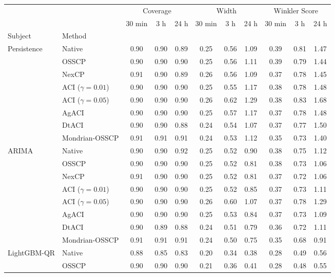 \begin{tabular}{@{}llccccccccc@{}}
\toprule
 &  & \multicolumn{3}{c}{Coverage} & \multicolumn{3}{c}{Width} & \multicolumn{3}{c}{Winkler Score} \\
 &  & 30 min & 3 h & 24 h & 30 min & 3 h & 24 h & 30 min & 3 h & 24 h \\
Subject & Method &  &  &  &  &  &  &  &  &  \\
\midrule
\multirow[t]{8}{*}{Persistence} & Native & 0.90 & 0.90 & 0.89 & 0.25 & 0.56 & 1.09 & 0.39 & 0.81 & 1.47 \\
 & OSSCP & 0.90 & 0.90 & 0.90 & 0.25 & 0.56 & 1.11 & 0.39 & 0.79 & 1.44 \\
 & NexCP & 0.91 & 0.90 & 0.89 & 0.26 & 0.56 & 1.09 & 0.37 & 0.78 & 1.45 \\
 & ACI ($\gamma=0.01$) & 0.90 & 0.90 & 0.90 & 0.25 & 0.55 & 1.17 & 0.38 & 0.78 & 1.48 \\
 & ACI ($\gamma=0.05$) & 0.90 & 0.90 & 0.90 & 0.26 & 0.62 & 1.29 & 0.38 & 0.83 & 1.68 \\
 & AgACI & 0.90 & 0.90 & 0.90 & 0.25 & 0.57 & 1.17 & 0.37 & 0.78 & 1.48 \\
 & DtACI & 0.90 & 0.90 & 0.88 & 0.24 & 0.54 & 1.07 & 0.37 & 0.77 & 1.50 \\
 & Mondrian-OSSCP & 0.91 & 0.91 & 0.91 & 0.24 & 0.53 & 1.12 & 0.35 & 0.73 & 1.40 \\
\cmidrule{1-11}
\multirow[t]{8}{*}{ARIMA} & Native & 0.90 & 0.90 & 0.92 & 0.25 & 0.52 & 0.90 & 0.38 & 0.75 & 1.12 \\
 & OSSCP & 0.90 & 0.90 & 0.90 & 0.25 & 0.52 & 0.81 & 0.38 & 0.73 & 1.06 \\
 & NexCP & 0.91 & 0.90 & 0.90 & 0.25 & 0.52 & 0.81 & 0.37 & 0.72 & 1.06 \\
 & ACI ($\gamma=0.01$) & 0.90 & 0.90 & 0.90 & 0.25 & 0.52 & 0.85 & 0.37 & 0.73 & 1.11 \\
 & ACI ($\gamma=0.05$) & 0.90 & 0.90 & 0.90 & 0.26 & 0.60 & 1.07 & 0.37 & 0.78 & 1.29 \\
 & AgACI & 0.90 & 0.90 & 0.90 & 0.25 & 0.53 & 0.84 & 0.37 & 0.73 & 1.09 \\
 & DtACI & 0.90 & 0.89 & 0.88 & 0.24 & 0.51 & 0.79 & 0.36 & 0.72 & 1.11 \\
 & Mondrian-OSSCP & 0.91 & 0.91 & 0.91 & 0.24 & 0.50 & 0.75 & 0.35 & 0.68 & 0.91 \\
\cmidrule{1-11}
\multirow[t]{8}{*}{LightGBM-QR} & Native & 0.88 & 0.85 & 0.83 & 0.20 & 0.34 & 0.38 & 0.28 & 0.49 & 0.56 \\
 & OSSCP & 0.90 & 0.90 & 0.90 & 0.21 & 0.36 & 0.41 & 0.28 & 0.48 & 0.55 \\

\end{tabular}
